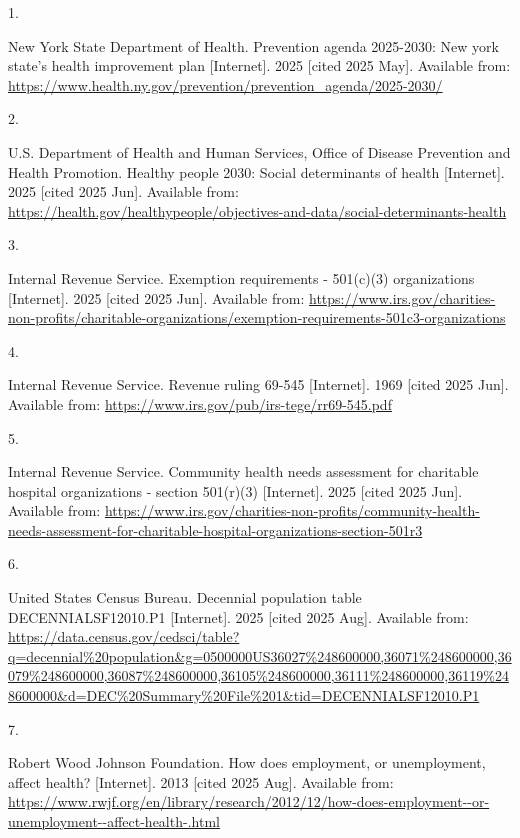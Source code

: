 \documentclass[
  english,
  letterpaper,
]{report}
\newlength{\cslhangindent}
\newlength{\csllabelwidth}
\newenvironment{CSLReferences}[2] %
 {\begin{list}{}{%
  \setlength{\itemindent}{0pt}
  \setlength{\leftmargin}{0pt}
  \setlength{\parsep}{0pt}
  \ifodd #1
   \setlength{\leftmargin}{\cslhangindent}
   \setlength{\itemindent}{-1\cslhangindent}
  \fi
  \setlength{\itemsep}{#2\baselineskip}}}
 {\end{list}}
\newcommand{\CSLLeftMargin}[1]{\parbox[t]{\csllabelwidth}{\strut#1\strut}}
\newcommand{\CSLRightInline}[1]{\parbox[t]{\linewidth - \csllabelwidth}{\strut#1\strut}}
\begin{document}
\label{refs}
\begin{CSLReferences}{0}{1}
\CSLLeftMargin{1. }%
\CSLRightInline{New York State Department of Health. Prevention agenda
2025-2030: New york state's health improvement plan {[}Internet{]}. 2025
{[}cited 2025 May{]}. Available from:
\url{https://www.health.ny.gov/prevention/prevention_agenda/2025-2030/}}

\CSLLeftMargin{2. }%
\CSLRightInline{U.S. Department of Health and Human Services, Office of
Disease Prevention and Health Promotion. Healthy people 2030: Social
determinants of health {[}Internet{]}. 2025 {[}cited 2025 Jun{]}.
Available from:
\url{https://health.gov/healthypeople/objectives-and-data/social-determinants-health}}

\CSLLeftMargin{3. }%
\CSLRightInline{Internal Revenue Service. Exemption requirements -
501(c)(3) organizations {[}Internet{]}. 2025 {[}cited 2025 Jun{]}.
Available from:
\url{https://www.irs.gov/charities-non-profits/charitable-organizations/exemption-requirements-501c3-organizations}}

\CSLLeftMargin{4. }%
\CSLRightInline{Internal Revenue Service. Revenue ruling 69-545
{[}Internet{]}. 1969 {[}cited 2025 Jun{]}. Available from:
\url{https://www.irs.gov/pub/irs-tege/rr69-545.pdf}}

\CSLLeftMargin{5. }%
\CSLRightInline{Internal Revenue Service. Community health needs
assessment for charitable hospital organizations - section 501(r)(3)
{[}Internet{]}. 2025 {[}cited 2025 Jun{]}. Available from:
\url{https://www.irs.gov/charities-non-profits/community-health-needs-assessment-for-charitable-hospital-organizations-section-501r3}}

\CSLLeftMargin{6. }%
\CSLRightInline{United States Census Bureau. Decennial population table
DECENNIALSF12010.P1 {[}Internet{]}. 2025 {[}cited 2025 Aug{]}. Available
from:
\url{https://data.census.gov/cedsci/table?q=decennial\%20population&g=0500000US36027\%248600000,36071\%248600000,36079\%248600000,36087\%248600000,36105\%248600000,36111\%248600000,36119\%248600000&d=DEC\%20Summary\%20File\%201&tid=DECENNIALSF12010.P1}}

\CSLLeftMargin{7. }%
\CSLRightInline{Robert Wood Johnson Foundation. How does employment, or
unemployment, affect health? {[}Internet{]}. 2013 {[}cited 2025 Aug{]}.
Available from:
\url{https://www.rwjf.org/en/library/research/2012/12/how-does-employment--or-unemployment--affect-health-.html}}


\end{CSLReferences}
\end{document}
